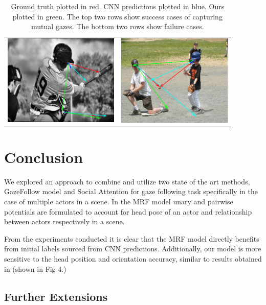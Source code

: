 \documentclass[10pt,twocolumn,letterpaper]{article}
\begin{document}
\begin{table}[ht]
\begin{tabular}{|c|c|}
    \includegraphics[width=55mm]{images/failure3.png} & \includegraphics[width=55mm]{images/failure4.png} \\
  \end{tabular}

  \caption{Ground truth plotted in red. CNN predictions plotted in blue. Ours plotted in green. The top two rows show success cases of capturing mutual gazes. The bottom two rows show failure cases.}
\end{table}

\section{Conclusion}

We explored an approach to combine and utilize two state of the art methods, GazeFollow model \cite{nips15_recasens} and Social Attention \cite{fathi2012social} for gaze following task specifically in the case of multiple actors in a scene. In the MRF model unary and pairwise potentials are formulated to account for head pose of an actor and relationship between actors respectively in a scene.

From the experiments conducted it is clear that the MRF model directly benefits from initial labels sourced from CNN predictions. Additionally, our model is more sensitive to the head position and orientation accuracy, similar to results obtained in \cite{nips15_recasens} (shown in Fig 4.)

\subsection{Further Extensions}
\end{document}
